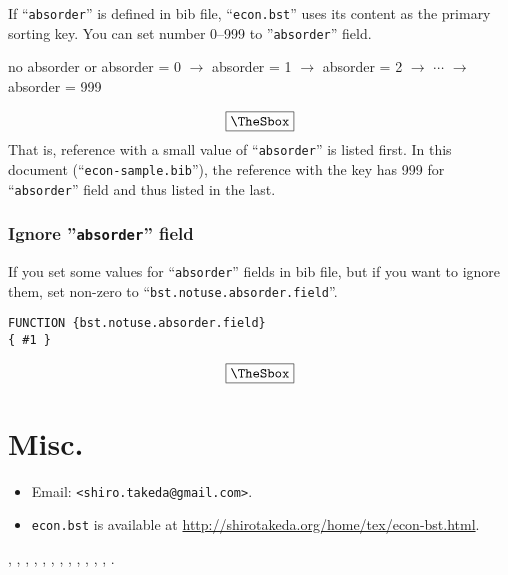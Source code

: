 \documentclass[10pt]{article}
\newenvironment{Frame}%
{\setlength{\fboxsep}{15pt}
\setlength{\mylength}{\linewidth}%
\addtolength{\mylength}{-2\fboxsep}%
\addtolength{\mylength}{-2\fboxrule}%
\Sbox
\minipage{\mylength}%
\setlength{\abovedisplayskip}{0pt}%
\setlength{\belowdisplayskip}{0pt}%
}%
{\endminipage\endSbox
\[\fbox{\TheSbox}\]}
\begin{document}
If ``\texttt{absorder}'' is defined in bib file,
``\texttt{econ.bst}'' uses its content as the primary sorting key.
You can set number 0--999 to ''\texttt{absorder}'' field.

\begin{Frame}
\begin{center}
 no absorder or absorder = 0  $\rightarrow$ absorder = 1 $\rightarrow$ absorder = 2
 $\rightarrow$ $\cdots$ $\rightarrow$ absorder = 999
\end{center}
\end{Frame}
That is, reference with a small value of ``\texttt{absorder}'' is listed
first.  In this document (``\texttt{econ-sample.bib}''), the reference
with the key \citet{takeda10:_cge_analy_welfar_effec_trade} has 999 for
``\texttt{absorder}'' field and thus listed in the last.


\subsubsection{Ignore ''\texttt{absorder}'' field}

If you set some values for ``\texttt{absorder}'' fields in bib file,
but if you want to ignore them, set non-zero to
``\texttt{bst.notuse.absorder.field}''.
\begin{Frame}
\begin{verbatim}
FUNCTION {bst.notuse.absorder.field}
{ #1 }
\end{verbatim}
\end{Frame}

\section{Misc.}

\begin{itemize}
 \item Email: \verb|<shiro.takeda@gmail.com>|.
 \item \texttt{econ.bst} is available at \url{http://shirotakeda.org/home/tex/econ-bst.html}.
\end{itemize}
\vspace*{1em}

\citet{borgers95:_note_implem_stron_domin},
\citet{bergemann11:_ration},
\citet{takeda2011c},
\citet{Takeda2011b},
\citet{Takeda2011a},
\citet{Biker-2007-unemployment},
\citet{Babiker-1999-JapaneseNuclearPower},
\citet{Babiker-1999-KyotoProtocoland},
\citet{Babiker2000525},
\citet{BabikerRutherford-2005-EconomicEffectsof},
\citet{goldin:katz:2011}, \citet{goldin:katz:2008}, \citet{goldin:katz:2000}.
\vspace*{1em}

\nocite{*}




\end{document}

